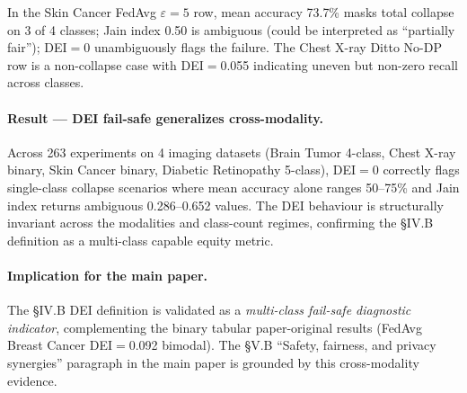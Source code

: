 \documentclass[conference]{IEEEtran}
\begin{document}
\begin{table}[htbp]
\centering
\caption{DEI as multi-class fail-safe indicator: representative cells from the E5 benchmark where single-class collapse is masked by aggregate accuracy and ambiguously labelled by Jain, but unambiguously flagged by DEI$=$0.}
\label{tab:pre_rebuttal_dei_failsafe}
\small
\setlength{\tabcolsep}{4pt}

\vspace{1mm}
\footnotesize{In the Skin Cancer FedAvg $\varepsilon{=}5$ row, mean accuracy 73.7\% masks total collapse on 3 of 4 classes; Jain index 0.50 is ambiguous (could be interpreted as ``partially fair''); DEI$=$0 unambiguously flags the failure. The Chest X-ray Ditto No-DP row is a non-collapse case with DEI$=$0.055 indicating uneven but non-zero recall across classes.}
\end{table}

\paragraph{Result --- DEI fail-safe generalizes cross-modality.} Across 263 experiments on 4 imaging datasets (Brain Tumor 4-class, Chest X-ray binary, Skin Cancer binary, Diabetic Retinopathy 5-class), DEI$=$0 correctly flags single-class collapse scenarios where mean accuracy alone ranges 50--75\% and Jain index returns ambiguous 0.286--0.652 values. The DEI behaviour is structurally invariant across the modalities and class-count regimes, confirming the §IV.B definition as a multi-class capable equity metric.

\paragraph{Implication for the main paper.} The §IV.B DEI definition is validated as a \emph{multi-class fail-safe diagnostic indicator}, complementing the binary tabular paper-original results (FedAvg Breast Cancer DEI$=$0.092 bimodal). The §V.B ``Safety, fairness, and privacy synergies'' paragraph in the main paper is grounded by this cross-modality evidence.
\end{document}
